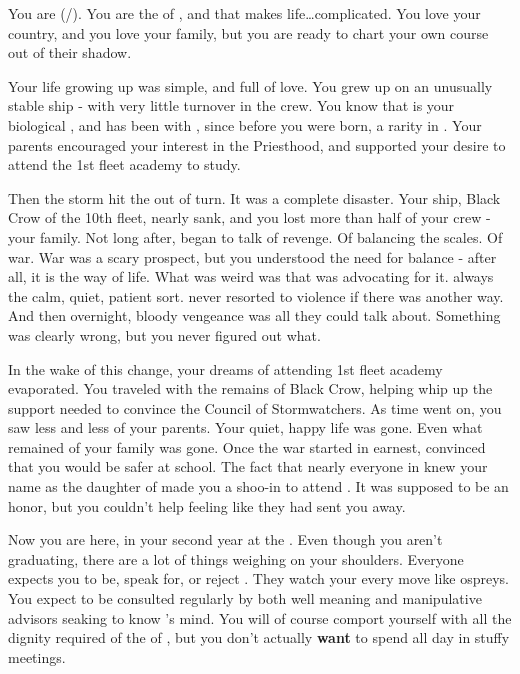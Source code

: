 \documentclass[char]{GL2020}
\begin{document}
\name{\cWarlordDaughter{}}

You are \cWarlordDaughter{} (\cWarlordDaughter{\They}/\cWarlordDaughter{\Them}). You are the \cWarlordDaughter{\child} of \cLoud{\full}, and that makes life\ldots complicated. You love your country, and you love your family, but you are ready to chart your own course out of their shadow.

Your life growing up was simple, and full of love. You grew up on an unusually stable ship - with very little turnover in the crew. You know that \cLoud{} is your biological \cLoud{\parent}, and has been with \cQuiet{\full}, since before you were born, a rarity in \pShip{}. Your parents encouraged your interest in the Priesthood, and supported your desire to attend the 1st fleet academy to study.

Then the storm hit the \pShip{} out of turn. It was a complete disaster. Your ship, Black Crow of the 10th fleet, nearly sank, and you lost more than half of your crew - your family. Not long after, \cLoud{} began to talk of revenge. Of balancing the scales. Of war. War was a scary prospect, but you understood the need for balance - after all, it is the \pShippies{} way of life. What was weird was that \cLoud{} was advocating for it. \cLoud{\They} \cLoud{\were} always the calm, quiet, patient sort. \cLoud{\They} never resorted to violence if there was another way. And then overnight, bloody vengeance was all they could talk about. Something was clearly wrong, but you never figured out what.

In the wake of this change, your dreams of attending 1st fleet academy evaporated. You traveled with the remains of Black Crow, helping \cLoud{} whip up the support \cLoud{\they} needed to convince the Council of Stormwatchers. As time went on, you saw less and less of your parents. Your quiet, happy life was gone. Even what remained of your family was gone. Once the war started in earnest, \cQuiet{} convinced \cLoud{} that you would be safer at school. The fact that nearly everyone in \pShip{} knew your name as the daughter of \cLoud{} made you a shoo-in to attend \pSchool{}. It was supposed to be an honor, but you couldn’t help feeling like they had sent you away.

Now you are here, in your second year at the \pSc{}. Even though you aren’t graduating, there are a lot of things weighing on your shoulders. Everyone expects you to be, speak for, or reject \cLoud{}. They watch your every move like ospreys. You expect to be consulted regularly by both well meaning and manipulative advisors seaking to know \cLoud{}’s mind. You will of course comport yourself with all the dignity required of the \cWarlordDaughter{\child} of \cLoud{\full}, but you don't actually \textbf{want} to spend all day in stuffy meetings.
\end{document}

